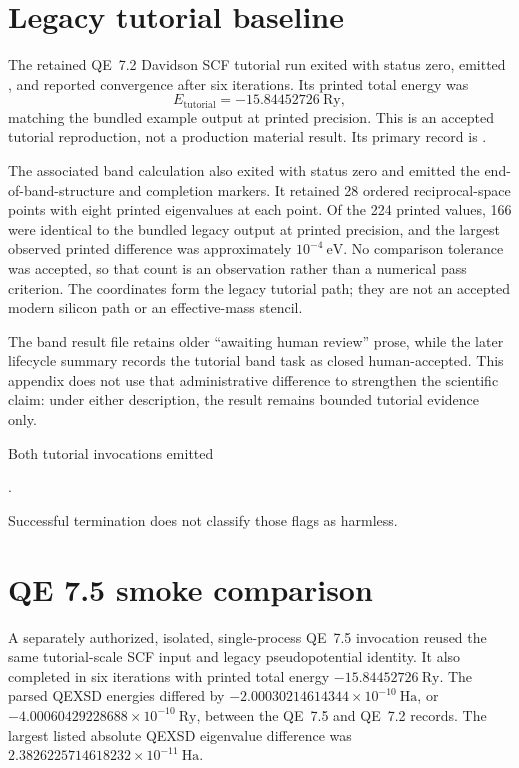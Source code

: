 \section{Legacy tutorial baseline}

The retained QE~7.2 Davidson SCF tutorial run exited with status zero, emitted
, and reported convergence after six iterations. Its printed
total energy was
\begin{equation}
  E_{\mathrm{tutorial}}=-15.84452726\ \mathrm{Ry},
\end{equation}
matching the bundled example output at printed precision. This is an accepted
tutorial reproduction, not a production material result. Its primary record is
.

The associated band calculation also exited with status zero and emitted the
end-of-band-structure and completion markers. It retained 28 ordered
reciprocal-space points with eight printed eigenvalues at each point. Of the
224 printed values, 166 were identical to the bundled legacy output at printed
precision, and the largest observed printed difference was approximately
$10^{-4}\ \mathrm{eV}$. No comparison tolerance was accepted, so that count is
an observation rather than a numerical pass criterion. The coordinates form
the legacy tutorial path; they are not an accepted modern silicon path or an
effective-mass stencil.

The band result file retains older ``awaiting human review'' prose, while the
later lifecycle summary records the tutorial band task as closed
human-accepted. This appendix does not use that administrative difference to
strengthen the scientific claim: under either description, the result remains
bounded tutorial evidence only.

Both tutorial invocations emitted
\begin{center}
\small{}.
\end{center}
Successful termination does not classify those flags as harmless.

\section{QE 7.5 smoke comparison}

A separately authorized, isolated, single-process QE~7.5 invocation reused the
same tutorial-scale SCF input and legacy pseudopotential identity. It also
completed in six iterations with printed total energy
$-15.84452726\ \mathrm{Ry}$. The parsed QEXSD energies differed by
$-2.00030214614344\times10^{-10}\ \mathrm{Ha}$, or
$-4.00060429228688\times10^{-10}\ \mathrm{Ry}$, between the QE~7.5 and QE~7.2
records. The largest listed absolute QEXSD eigenvalue difference was
$2.3826225714618232\times10^{-11}\ \mathrm{Ha}$.

